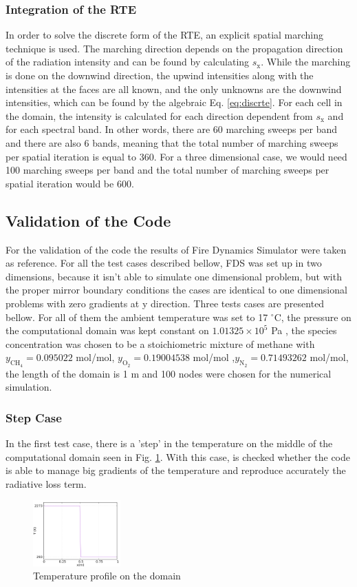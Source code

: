 \documentclass{warpdoc}
\begin{document}
\subsubsection{Integration of the RTE}
In order to solve the discrete form of the RTE, an explicit spatial marching technique is used. The marching direction depends on the propagation direction of the radiation intensity and can be found by calculating $s_\text{x}$. While the marching is done on the downwind direction, the upwind intensities along with the intensities at the faces are all known, and the only unknowns are the downwind intensities, which can be found by the algebraic Eq. \eqref{eq:discrte}. For each cell in the domain, the intensity is calculated for each direction dependent from $s_{\text{x}}$ and for each spectral band. In other words, there are 60 marching sweeps per band and there are also 6 bands, meaning that the total number of marching sweeps per spatial iteration is equal to 360. For a three dimensional case, we would need 100 marching sweeps per band and the total number of marching sweeps per spatial iteration would be 600.
\subsection{Validation of the Code}
For the validation of the code the results of Fire Dynamics Simulator were taken as reference. For all the test cases described bellow, FDS was set up in two dimensions, because it isn't able to simulate one dimensional problem, but with the proper mirror boundary conditions the cases are identical to one dimensional problems with zero gradients at y direction. Three tests cases are presented bellow. For all of them the ambient temperature was set to 17 $^\circ$C, the pressure on the computational domain was kept constant on $1.01325\times10^5$ Pa , the species concentration was chosen to be a stoichiometric mixture of methane with $y_{\text{CH}_4}=0.095022$ mol/mol, $y_{\text{O}_2}= 0.19004538$ mol/mol ,$ y_{\text{N}_2}=0.71493262$ mol/mol, the length of the domain is 1 m and 100 nodes were chosen for the numerical simulation.
\subsubsection{Step Case}
In the first test case, there is a 'step' in the temperature on the middle of the computational domain seen in Fig. \ref{fig:steptemp}. With this case, is checked whether the code is able to manage big gradients of the temperature and reproduce accurately the radiative loss term.
\begin{figure}[!h]
\centering
\includegraphics[width=0.3\textwidth]{2000-20step_temp.png}
\caption{Temperature profile on the domain}
\label{fig:steptemp}
\end{figure}
\end{document}
